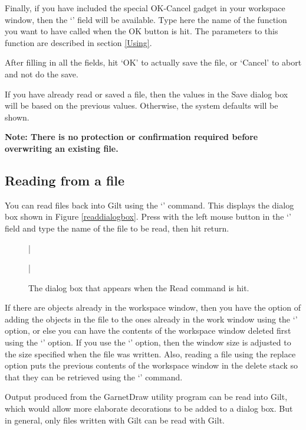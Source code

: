 Finally, if you have included the special OK-Cancel gadget in your
workspace window, then the `' field will be
available.  Type here the name of the function you want to have called
when the OK button is hit.  The parameters to this function are
described in section \ref{Using}.

After filling in all the fields, hit `OK' to actually save the file, or
`Cancel' to abort and not do the save.

If you have already read or saved a file, then the values in the Save
dialog box will be based on the previous values.  Otherwise, the
system defaults will be shown.

{\bf Note: There is no protection or confirmation required before
overwriting an existing file.}


\subsection{Reading from a file}

You can read files back into Gilt using the `' command.
This displays the dialog box shown in Figure \ref{readdialogbox}.
Press with the left mouse button in the `' field and type
the name of the file to be read, then hit return.

\begin{figure}
\bar{}
\begin{center}
\end{center}
\caption{The dialog box that appears when the Read command is hit.}
\bar{}
\end{figure}

If there are objects already in the workspace window, then you have
the option of adding the objects in the file to the ones already in
the work window using the `' option, or else
you can have the contents of the workspace window deleted first using
the `' option.  If you use the `'
option, then the window size is adjusted to the size specified when
the file was written.  Also, reading a file using the replace option puts the
previous contents of the workspace window in the delete stack so
that they can be retrieved using the `' command.

Output produced from the GarnetDraw utility program can be read into Gilt,
which would allow more elaborate decorations to be added to a dialog box.
But in general, only files written with Gilt can be read with Gilt.


